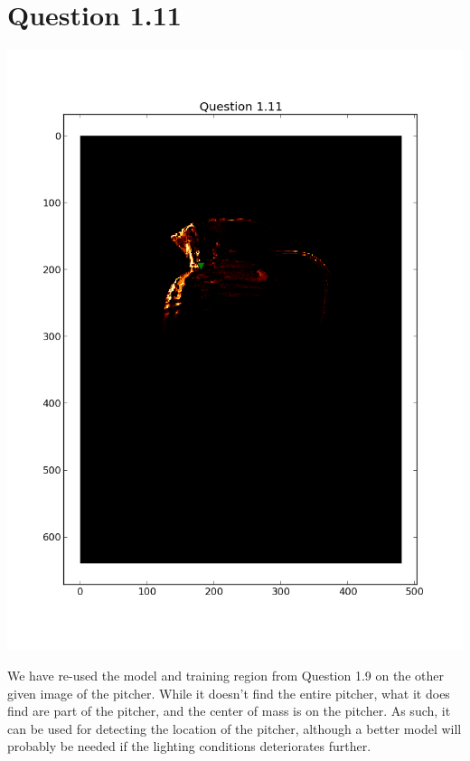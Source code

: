 \documentclass[11pt,a4paper]{article}
\begin{document}
\section{Question 1.11}
\includegraphics[width=1.1\textwidth]{figure_9.png}

We have re-used the model and training region from Question 1.9 on the other given image of the pitcher. While it doesn't find the entire pitcher, what it does find are part of the pitcher, and the center of mass is on the pitcher. As such, it can be used for detecting the location of the pitcher, although a better model will probably be needed if the lighting conditions deteriorates further.

\appendix
\newpage
\end{document}

